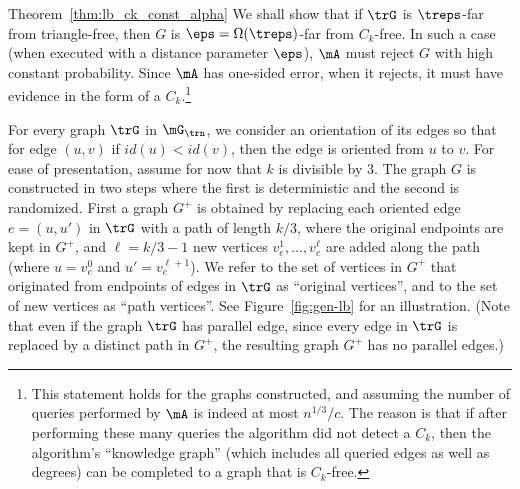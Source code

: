 \begin{proofof}{Theorem~\ref{thm:lb_ck_const_alpha}}
We shall show that 
if $\trG$ is $\treps$-far from triangle-free, then $G$ is $\eps=\Omega(\treps)$-far from $C_k$-free. In such a case (when executed with a distance parameter $\eps$),  $\mA$ must reject $G$ with high constant probability. Since $\mA$ has one-sided error, when it rejects, it must have evidence in the form of a $C_k$.\footnote{This statement holds for the graphs constructed, and assuming the number of queries performed by $\mA$ is indeed at most $n^{1/3}/c$. The reason is that if after performing these many queries the algorithm did not detect a $C_k$, then the algorithm's  ``knowledge graph'' (which includes all queried edges as well as degrees) can be completed to a graph that is $C_k$-free. }


For every graph $\trG$ in $\mG_{\trn}$,   we consider an orientation of its edges so that for  edge $(u,v)$  if $id(u)< id(v)$, 
then the edge is oriented from $u$ to $v$.  For ease of presentation, assume for now that $k$ is divisible by $3$.
The graph $G$ is constructed in two steps where the first is deterministic and the second is randomized. First a graph $G^+$ is obtained by replacing each oriented edge $e=(u,u')$ in $\trG$ with a path of length $k/3$, where the original endpoints are kept in $G^+$, and $\ell=k/3-1$ new vertices $v_{e}^1, \ldots, v_{e}^{\ell}$ are added along the path (where $u=v_{e}^0$ and $u'=v_e^{\ell+1}$).
We refer to the set of vertices in $G^+$ that originated from endpoints of edges in $\trG$ as ``original vertices'', and to the set of new vertices as ``path vertices''.
See Figure~\ref{fig:gen-lb} for an illustration.
(Note that even if the graph $\trG$ has parallel edge, since every edge in $\trG$ is replaced by a distinct path in $G^+$, the resulting graph $G^+$ has no parallel edges.)


\end{proofof}
